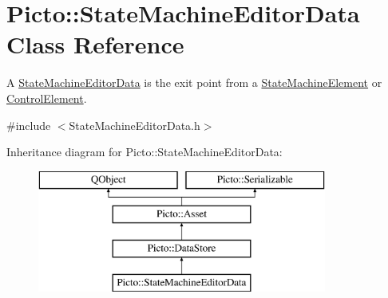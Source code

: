 \hypertarget{class_picto_1_1_state_machine_editor_data}{\section{Picto\-:\-:State\-Machine\-Editor\-Data Class Reference}
\label{class_picto_1_1_state_machine_editor_data}
}


A \hyperlink{class_picto_1_1_state_machine_editor_data}{State\-Machine\-Editor\-Data} is the exit point from a \hyperlink{class_picto_1_1_state_machine_element}{State\-Machine\-Element} or \hyperlink{class_picto_1_1_control_element}{Control\-Element}.  




{\ttfamily \#include $<$State\-Machine\-Editor\-Data.\-h$>$}

Inheritance diagram for Picto\-:\-:State\-Machine\-Editor\-Data\-:\begin{figure}[H]
\begin{center}
\leavevmode
\includegraphics[height=4.000000cm]{class_picto_1_1_state_machine_editor_data}
\end{center}
\end{figure}
